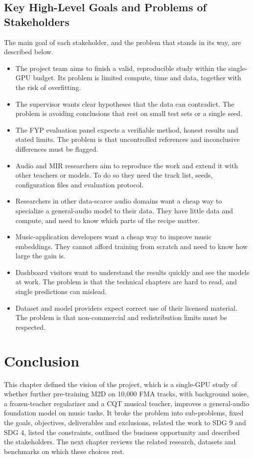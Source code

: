 \documentclass{FastFyp}
\begin{document}
\subsection{Key High-Level Goals and Problems of Stakeholders}
The main goal of each stakeholder, and the problem that stands in its way, are described below.
\begin{itemize}
  \item The project team aims to finish a valid, reproducible study within the single-GPU budget. Its problem is limited compute, time and data, together with the risk of overfitting.
  \item The supervisor wants clear hypotheses that the data can contradict. The problem is avoiding conclusions that rest on small test sets or a single seed.
  \item The FYP evaluation panel expects a verifiable method, honest results and stated limits. The problem is that uncontrolled references and inconclusive differences must be flagged.
  \item Audio and MIR researchers aim to reproduce the work and extend it with other teachers or models. To do so they need the track list, seeds, configuration files and evaluation protocol.
  \item Researchers in other data-scarce audio domains want a cheap way to specialize a general-audio model to their data. They have little data and compute, and need to know which parts of the recipe matter.
  \item Music-application developers want a cheap way to improve music embeddings. They cannot afford training from scratch and need to know how large the gain is.
  \item Dashboard visitors want to understand the results quickly and see the models at work. The problem is that the technical chapters are hard to read, and single predictions can mislead.
  \item Dataset and model providers expect correct use of their licensed material. The problem is that non-commercial and redistribution limits must be respected.
\end{itemize}

\FloatBarrier
\section{Conclusion}
\label{sec:vision-conclusion}
This chapter defined the vision of the project, which is a single-GPU study of whether further pre-training M2D on 10,000 FMA tracks, with background noise, a frozen-teacher regularizer and a CQT musical teacher, improves a general-audio foundation model on music tasks. It broke the problem into sub-problems, fixed the goals, objectives, deliverables and exclusions, related the work to SDG 9 and SDG 4, listed the constraints, outlined the business opportunity and described the stakeholders. The next chapter reviews the related research, datasets and benchmarks on which these choices rest.
\end{document}
